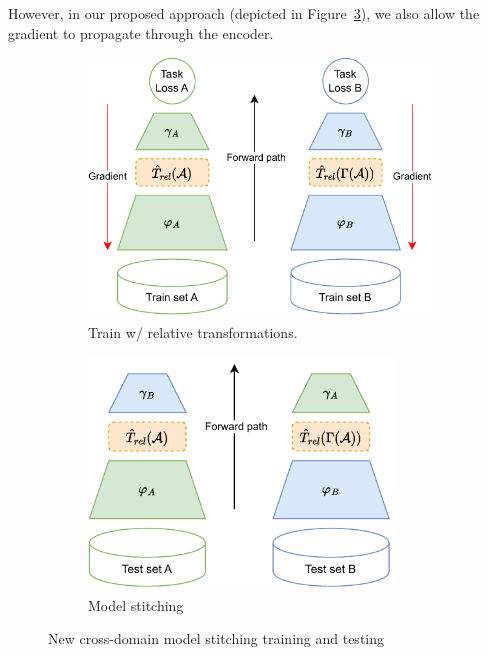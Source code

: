 \documentclass[../main.tex]{subfiles}
\begin{document}
However, in our proposed approach (depicted in Figure~\ref{fig:fullCrossDomainScheme}), we also allow the gradient to propagate through the encoder.

\begin{figure}[ht!]
     \centering
    \begin{subfigure}[b]{0.45\textwidth}
         \centering
         \includegraphics[width=\textwidth]{figures/mt/relativeFullTrainScheme.pdf}
        \caption{Train w/ relative transformations.}
         \label{fig:relFullTrainScheme}
     \end{subfigure}\hfill
      \begin{subfigure}[b]{0.45\textwidth}
         \centering
         \includegraphics[width=0.9\textwidth]{figures/mt/relativeFullStitchScheme.pdf}
        \caption{Model stitching}
         \label{fig:relFullStitchScheme}
     \end{subfigure}
    \caption{New cross-domain model stitching training and testing}
    \label{fig:fullCrossDomainScheme}
\end{figure}
\end{document}
